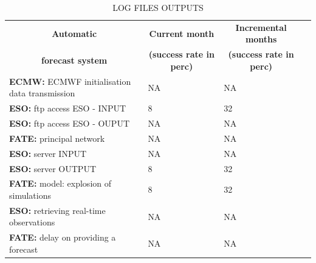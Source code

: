 \documentclass[11pt,english]{article}
\newcommand{\HRule}{\rule{\linewidth}{0.5mm}}
\begin{document}
\clearpage
\begin{table}[]
\begin{center}
\begin{tabular}{|l|l|l|l|}
\hline
\multicolumn{1}{|c|}{\cellcolor[HTML]{C0C0C0}\textbf{Automatic}} & \multicolumn{1}{c|}{\cellcolor[HTML]{C0C0C0}\textbf{Current month}} & \multicolumn{1}{c|}{\cellcolor[HTML]{C0C0C0}\textbf{Incremental months}} \\
\multicolumn{1}{|c|}{\cellcolor[HTML]{C0C0C0}\textbf{forecast system}} & \multicolumn{1}{c|}{\cellcolor[HTML]{C0C0C0}\textbf{(success rate in perc)}} & \multicolumn{1}{c|}{\cellcolor[HTML]{C0C0C0}\textbf{(success rate in perc)}} \\
\hline
\cellcolor[HTML]{C0C0C0}\textbf{ECMW:} ECMWF initialisation data transmission  & NA           & NA    \\
\cellcolor[HTML]{C0C0C0}\textbf{ESO:} ftp access ESO - INPUT                   & 8           & 32   \\
\cellcolor[HTML]{C0C0C0}\textbf{ESO:} ftp access ESO - OUPUT                   & NA           & NA   \\
\cellcolor[HTML]{C0C0C0}\textbf{FATE:} principal network                       & NA           & NA   \\
\cellcolor[HTML]{C0C0C0}\textbf{ESO:} server INPUT                             & NA           & NA   \\
\cellcolor[HTML]{C0C0C0}\textbf{ESO:} server OUTPUT                            & 8           & 32   \\
\cellcolor[HTML]{C0C0C0}\textbf{FATE:} model: explosion of simulations         & 8           & 32   \\
\cellcolor[HTML]{C0C0C0}\textbf{ESO:} retrieving real-time observations        & NA           & NA   \\
\cellcolor[HTML]{C0C0C0}\textbf{FATE:} delay on providing a forecast           & NA           & NA   \\
\hline
\end{tabular}
\caption{LOG FILES OUTPUTS}
\end{center}
\end{table}

\clearpage
\end{document}
